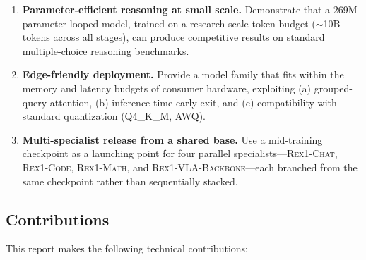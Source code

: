 \documentclass[11pt,a4paper]{article}
\begin{document}
\begin{enumerate}[leftmargin=*]
  \item \textbf{Parameter-efficient reasoning at small scale.}
    Demonstrate that a 269M-parameter looped model, trained on a research-scale
    token budget ($\sim$10B tokens across all stages), can produce
    competitive results on standard multiple-choice reasoning benchmarks.

  \item \textbf{Edge-friendly deployment.}
    Provide a model family that fits within the memory and latency budgets of
    consumer hardware, exploiting (a) grouped-query attention, (b) inference-time
    early exit, and (c) compatibility with standard quantization (Q4\_K\_M, AWQ).

  \item \textbf{Multi-specialist release from a shared base.}
    Use a mid-training checkpoint as a launching point for four parallel
    specialists---\textsc{Rex1-Chat}, \textsc{Rex1-Code}, \textsc{Rex1-Math},
    and \textsc{Rex1-VLA-Backbone}---each branched from the same checkpoint
    rather than sequentially stacked.
\end{enumerate}

\subsection{Contributions}

This report makes the following technical contributions:
\end{document}
